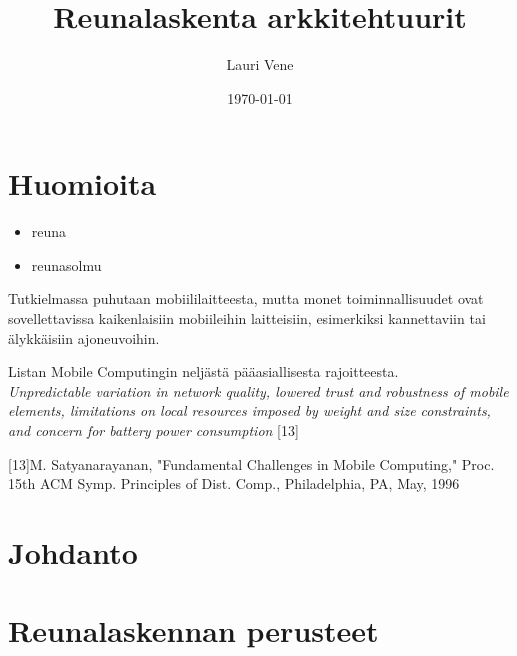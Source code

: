 \documentclass[finnish]{tktltiki2}
\title{Reunalaskenta arkkitehtuurit}
\author{Lauri Vene}
\date{\today}
\theoremstyle{definition}
\theoremstyle{remark}
\begin{document}

\frontmatter      %

\maketitle        %
\makeabstract     %

\tableofcontents  %


\mainmatter       %


\section{Huomioita}
\begin{itemize}
\item reuna
\item reunasolmu
\end{itemize}

Tutkielmassa puhutaan mobiililaitteesta, mutta monet toiminnallisuudet ovat sovellettavissa kaikenlaisiin mobiileihin laitteisiin, esimerkiksi kannettaviin tai älykkäisiin ajoneuvoihin. 

Listan Mobile Computingin neljästä pääasiallisesta rajoitteesta.\\
\textit{Unpredictable variation in network quality, lowered trust and robustness of
mobile elements, limitations on local resources imposed by
weight and size constraints, and concern for battery power
consumption} [13]

[13]M. Satyanarayanan, "Fundamental Challenges in Mobile Computing," Proc.
15th ACM Symp. Principles of Dist. Comp., Philadelphia, PA, May, 1996



\section{Johdanto}


\section{Reunalaskennan perusteet}
\end{document}
